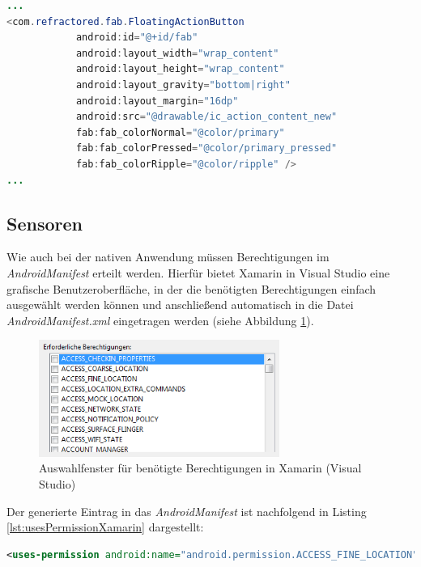 \begin{lstlisting}[caption=Deklaration des \textit{FloatingActionButton} in der Datei \textit{app\_bar.axml}, label=lst:FABXamarin, language=Java]
...
<com.refractored.fab.FloatingActionButton
            android:id="@+id/fab"
            android:layout_width="wrap_content"
            android:layout_height="wrap_content"
            android:layout_gravity="bottom|right"
            android:layout_margin="16dp"
            android:src="@drawable/ic_action_content_new"
            fab:fab_colorNormal="@color/primary"
            fab:fab_colorPressed="@color/primary_pressed"
            fab:fab_colorRipple="@color/ripple" />
...
\end{lstlisting}

\subsection*{Sensoren}

Wie auch bei der nativen Anwendung müssen Berechtigungen im \textit{AndroidManifest} erteilt werden. Hierfür bietet Xamarin in Visual Studio eine grafische Benutzeroberfläche, in der die benötigten Berechtigungen einfach ausgewählt werden können und anschließend automatisch in die Datei \textit{AndroidManifest.xml} eingetragen werden (siehe Abbildung \ref{fig:PermissionsAuswXamarin}). 

\begin{figure}[h]
	\centering
	\includegraphics[width=0.7\textwidth]{Bilder/Permissions_Xamarin.PNG}
	\caption{Auswahlfenster für benötigte Berechtigungen in Xamarin (Visual Studio)}
	\label{fig:PermissionsAuswXamarin}
\end{figure}

Der generierte Eintrag in das \textit{AndroidManifest} ist nachfolgend in Listing \ref{lst:usesPermissionXamarin} dargestellt:

\begin{lstlisting}[caption=Erlaubnis für die Nutzung eines Dienstes im \textit{AndroidManifest} (Xamarin), label=lst:usesPermissionXamarin, language=XML]
<uses-permission android:name="android.permission.ACCESS_FINE_LOCATION" />
\end{lstlisting}

